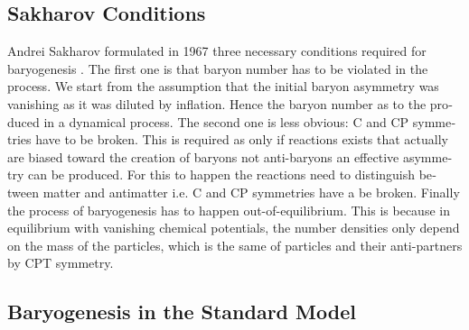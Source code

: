 \documentclass[master,       %
               twoside,        %
               BCOR10mm,       %
               english,ngerman, %
               ]{GAUBM}
\begin{document}
\begin{otherlanguage}{english}
\subsection{Sakharov Conditions}
Andrei Sakharov formulated in 1967 three necessary conditions required for baryogenesis \cite{Sakharov_1991}.
The first one is that baryon number has to be violated in the process. We start from the assumption that the initial baryon asymmetry was vanishing as it was diluted by inflation.
Hence the baryon number as to the produced in a dynamical process.
The second one is less obvious: C and CP symmetries have to be broken.
This is required as only if
reactions exists that actually are biased toward the creation of baryons not anti-baryons an effective asymmetry can be produced.
For this to happen the reactions need to distinguish between matter and antimatter i.e. C and CP symmetries have a be broken.
Finally the process of baryogenesis has to happen out-of-equilibrium. This is because
in equilibrium with vanishing chemical potentials, the number densities only depend on the mass of the particles, which is the same of particles and their anti-partners by CPT symmetry.


\subsection{Baryogenesis in the Standard Model}
\label{sec:baryogenesis_in_the_standard_model}


\end{otherlanguage}
\end{document}
